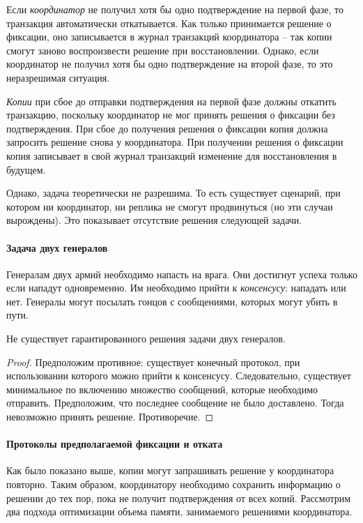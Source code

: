 Если \textit{координатор} не получил хотя бы одно подтверждение на первой фазе, то транзакция
автоматически откатывается. Как только принимается решение о фиксации, оно записывается в журнал
транзакций координатора -- так копии смогут заново воспроизвести решение при восстановлении.
Однако, если координатор не получил хотя бы одно подтверждение на второй фазе, то это неразрешимая
ситуация.

\textit{Копии} при сбое до отправки подтверждения на первой фазе должны откатить
транзакцию, поскольку
координатор не мог принять решения о фиксации без подтверждения. При сбое до получения решения о
фиксации копия должна запросить решение снова у координатора. При получении решения о фиксации
копия записывает в свой журнал транзакций изменение для восстановления в будущем.

Однако, задача теоретически не разрешима. То есть существует сценарий, при котором ни координатор,
ни реплика не смогут продвинуться (но эти случаи вырождены). Это показывает отсутствие решения
следующей задачи.

\paragraph{Задача двух генералов}

Генералам двух армий необходимо напасть на врага. Они достигнут успеха только если нападут
одновременно. Им необходимо прийти к \textit{консенсусу}: нападать или нет. Генералы могут
посылать гонцов с сообщениями, которых могут убить в пути.

\begin{proposition}
	Не существует гарантированного решения задачи двух генералов.
\end{proposition}

\begin{proof}
	Предположим противное: существует конечный протокол, при использовании которого можно прийти к
	консенсусу. Следовательно, существует минимальное по включению множество сообщений, которые
	необходимо отправить. Предположим, что последнее сообщение не было доставлено. Тогда невозможно
	принять решение. Противоречие.
\end{proof}

\paragraph{Протоколы предполагаемой фиксации и отката}

Как было показано выше, копии могут запрашивать решение у координатора повторно. Таким образом,
координатору необходимо сохранить информацию о решении до тех пор, пока не получит подтверждения от
всех копий. Рассмотрим два подхода оптимизации объема памяти, занимаемого решениями координатора.

